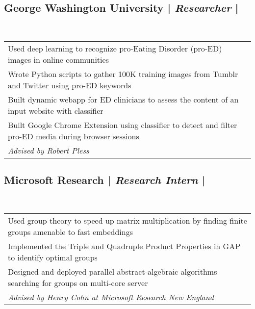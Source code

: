 \documentclass[a4paper,10pt]{article}
\begin{document}
\subsection{George Washington University | \emph{Researcher} |  }
~\begin{tabular}{@{~$\bullet$~~}l}
Used deep learning to recognize pro-Eating Disorder (pro-ED) images in online communities \\
Wrote Python scripts to gather 100K training images from Tumblr and Twitter using pro-ED keywords \\ %
Built dynamic webapp for ED clinicians to assess the content of an input website with classifier \\
Built Google Chrome Extension using classifier to detect and filter pro-ED media during browser sessions  \\
\textit{Advised by Robert Pless}\\
\end{tabular}

\subsection{Microsoft Research |  \emph{Research Intern} | }
~\begin{tabular}{@{~$\bullet$~~}l}
Used group theory to speed up matrix multiplication %
by finding finite groups amenable to fast embeddings\\
Implemented the Triple and Quadruple Product Properties in GAP to identify optimal groups  \\
Designed and deployed parallel abstract-algebraic algorithms searching for groups on multi-core server\\
\textit{Advised by Henry Cohn at Microsoft Research New England}\\
\end{tabular}
\end{document}
